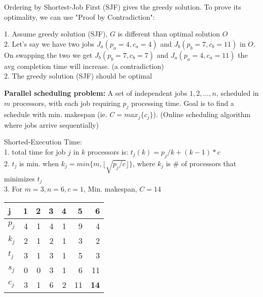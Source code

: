 Ordering by Shortest-Job First (SJF) gives the greedy solution. To prove its optimality, we can use "Proof by Contradiction":

1. Assume greedy solution (SJF), $G$ is different than optimal solution $O$\\
2. Let's say we have two jobs $J_a (p_a = 4, c_a = 4)$ and $J_b (p_b = 7, c_b = 11)$ in $O$. On swapping the two we get $J_b (p_b = 7, c_b = 7)$ and $J_a (p_a = 4, c_a = 11)$ the avg completion time will increase. (a contradiction)\\
2. The greedy solution (SJF) should be optimal

\textbf{Parallel scheduling problem:} A set of independent jobs $1,2,...,n$, scheduled in $m$ processors, with each job requiring $p_j$ processing time. Goal is to find a schedule with min. makespan (ie. $C = max_j\{c_j\}$). (Online scheduling algorithm where jobs arrive sequentially)

Shorted-Execution Time:\\
1. total time for job $j$ in $k$ processors is: $t_j(k) = p_j/k + (k-1)*c $\\
2. $t_j$ is min. when $k_j = min\{m, \lfloor \sqrt{p_j / c} \rfloor\}$, where $k_j$ is \# of processors that minimizes $t_j$\\ 
3. For $m=3, n=6, c=1$, Min. makespan, $C = 14$
\begin{center}
    \begin{tabular}{ |l|r|r|r|r|r|r| } 
        \hline
        j & 1 & 2 & 3 & 4 & 5 & 6 \\
        \hline
        $p_j$ & 4 & 1 & 4 & 1 & 9 & 4 \\
        $k_j$ & 2 & 1 & 2 & 1 & 3 & 2 \\
        $t_j$ & 3 & 1 & 3 & 1 & 5 & 3 \\
        $s_j$ & 0 & 0 & 3 & 1 & 6 & 11 \\
        $c_j$ & 3 & 1 & 6 & 2 & 11 & \textbf{14} \\
    \end{tabular}
\end{center}